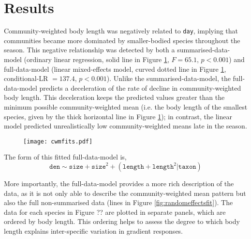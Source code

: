 \documentclass[12pt]{ecology}
\begin{document}



\section{Results}

Community-weighted body length was negatively related to \texttt{day}, implying that communities became more dominated by smaller-bodied species throughout the season.  This negative relationship was detected by both a summarised-data-model (ordinary linear regression, solid line in Figure \ref{fig:cwmfits}, $F = 65.1$, $p < 0.001$) and full-data-model (linear mixed-effects model, curved dotted line in Figure \ref{fig:cwmfits}, conditional-LR $= 137.4$, $p < 0.001$).  Unlike the summarised-data-model, the full-data-model predicts a deceleration of the rate of decline in community-weighted body length.  This deceleration keeps the predicted values greater than the minimum possible community-weighted mean (i.e. the body length of the smallest species, given by the thick horizontal line in Figure \ref{fig:cwmfits}); in contrast, the linear model predicted unrealistically low community-weighted means late in the season.  

\begin{figure}
\texttt{[image: cwmfits.pdf]}
\caption{}
\label{fig:cwmfits}
\end{figure}

The form of this fitted full-data-model is,
\begin{equation}
\mathtt{den} \sim \mathtt{size} + \mathtt{size}^2 + (\mathtt{length} + \mathtt{length}^2 | \mathtt{taxon})
\end{equation}

More importantly, the full-data-model provides a more rich description of the data, as it is not only able to describe the community-weighted mean pattern but also the full non-summarised data (lines in Figure \ref{fig:randomeffectsfit}).  The data for each species in Figure ?? are plotted in separate panels, which are ordered by body length.  This ordering helps to assess the degree to which body length explains inter-specific variation in gradient responses.  
\end{document}
